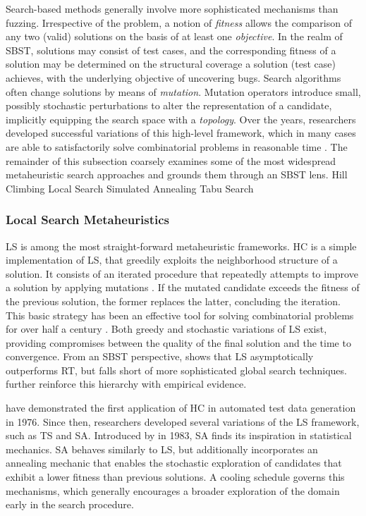 Search-based methods generally involve more sophisticated
mechanisms than fuzzing.
Irrespective of the problem, a notion of \textit{fitness}
allows the comparison of any two (valid) solutions
on the basis of at least one \textit{objective}.
In the realm of \gls{SBST}, solutions may consist
of test cases, and the corresponding fitness
of a solution may be determined on the structural
coverage a solution (test case) achieves, with the 
underlying objective of uncovering bugs.
Search algorithms often change solutions by means of \textit{mutation}.
Mutation operators introduce small, possibly stochastic perturbations
to alter the representation of a candidate, implicitly
equipping the search space with a \textit{topology}.
Over the years, researchers developed successful variations
of this high-level framework, which in many cases are able
to satisfactorily solve combinatorial
problems in reasonable time \citep{mcminn2011search}.
The remainder of this subsection coarsely examines
some of the most widespread metaheuristic search approaches
and grounds them through an \gls{SBST} lens.
 {Hill Climbing}
 {Local Search}
 {Simulated Annealing}
 {Tabu Search}

\subsubsection{Local Search Metaheuristics}

\Gls{LS} is among the most straight-forward
metaheuristic frameworks.
\Gls{HC} is a simple implementation of \gls{LS}, 
that greedily exploits the neighborhood structure 
of a solution.
It consists of an iterated procedure that repeatedly
attempts to improve a solution by applying mutations \cite{selman2006hill}.
If the mutated candidate exceeds the fitness of the previous
solution, the former replaces the latter, concluding the iteration.
This basic strategy has been an effective tool for 
solving combinatorial problems for over half a century \cite{lin1965computer}.
Both greedy and stochastic variations of \gls{LS} exist, providing 
compromises between the quality of the final solution
and the time to convergence.
From an \gls{SBST} perspective, \citet{arcuri2009theoretical} shows
that \gls{LS} asymptotically outperforms \gls{RT}, but falls short of 
more sophisticated global search techniques.
\citet{harman2007theoretical} further reinforce this hierarchy with
empirical evidence.

\citet{miller1976automatic} have demonstrated the
first application of \gls{HC} in automated test data generation in 1976.
Since then, researchers developed several variations of the 
\gls{LS} framework, such as \Gls{TS} \cite{glover1990tabu} and \Gls{SA}.
Introduced by \citet{kirkpatrick1983optimization} in 1983, \gls{SA}
finds its inspiration in statistical mechanics.
\gls{SA} behaves similarly to \gls{LS}, but
additionally incorporates an annealing mechanic that enables
the stochastic exploration of candidates that exhibit a lower
fitness than previous solutions.
A cooling schedule governs this mechanisms, which generally encourages
a broader exploration of the domain early in the search procedure.

